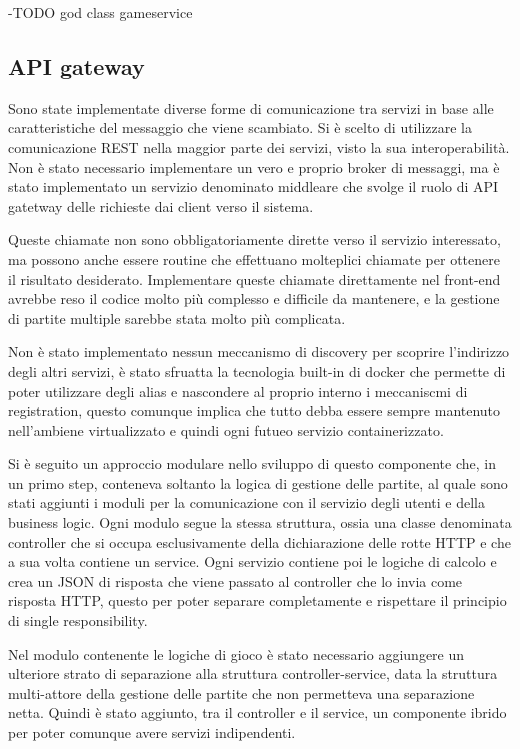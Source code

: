 -TODO god class gameservice

\subsection{API gateway}
Sono state implementate diverse forme di comunicazione tra servizi in base alle caratteristiche del messaggio che viene scambiato. Si è scelto di utilizzare la comunicazione REST nella maggior parte dei servizi, visto la sua interoperabilità.
Non è stato necessario implementare un vero e proprio broker di messaggi, ma è stato implementato un servizio denominato middleare che svolge il ruolo di API gatetway delle richieste dai client verso il sistema.

Queste chiamate non sono obbligatoriamente dirette verso il servizio interessato, ma possono anche essere routine che effettuano molteplici chiamate per ottenere il risultato desiderato. 
Implementare queste chiamate direttamente nel front-end avrebbe reso il codice molto più complesso e difficile da mantenere, e la gestione di partite multiple sarebbe stata molto più complicata.

\vspace{1cm}

Non è stato implementato nessun meccanismo di discovery per scoprire l'indirizzo degli altri servizi, è stato sfruatta la tecnologia built-in di docker che permette di poter utilizzare degli alias e nascondere al proprio interno i meccaniscmi di registration, questo comunque implica che tutto debba essere sempre mantenuto nell'ambiene virtualizzato e quindi ogni  futueo servizio containerizzato.

\vspace{1cm}

Si è seguito un approccio modulare nello sviluppo di questo componente che, in un primo step, conteneva soltanto la logica di gestione delle partite, al quale sono stati aggiunti i moduli per la comunicazione con il servizio degli utenti e della business logic. Ogni modulo segue la stessa struttura, ossia una classe denominata controller che si occupa esclusivamente della dichiarazione delle rotte HTTP e che a sua volta contiene un service. Ogni servizio contiene poi le logiche di calcolo e crea un JSON di risposta che viene passato al controller che lo invia come risposta HTTP, questo per poter separare completamente e rispettare il principio di single responsibility.

Nel modulo contenente le logiche di gioco è stato necessario aggiungere un ulteriore strato di separazione alla struttura controller-service, data la struttura multi-attore della gestione delle partite che non permetteva una separazione netta. Quindi è stato aggiunto, tra il controller e il service, un componente ibrido per poter comunque avere servizi indipendenti.

